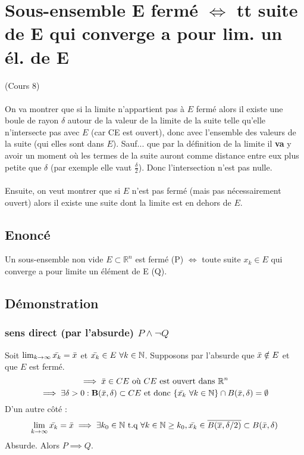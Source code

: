 \documentclass{article}
\begin{document}
\newpage

\section{Sous-ensemble E fermé $ \Leftrightarrow $ tt suite de E qui converge a pour lim. un él. de E}

(Cours 8)\\\\
On va montrer que si la limite n'appartient pas à $E$ fermé alors il existe une boule de rayon $\delta$ autour de la valeur de la limite de la suite telle qu'elle n'intersecte pas avec $E$ (car CE est ouvert), donc avec l'ensemble des valeurs de la suite (qui elles sont dans $E$). Sauf... que par la définition de la limite il \textbf{va} y avoir un moment où les termes de la suite auront comme distance entre eux plus petite que $\delta$ (par exemple elle vaut $\frac{\delta}{2}$). Donc l'intersection n'est pas nulle.\\\\
Ensuite, on veut montrer que si $E$ n'est pas fermé (mais pas nécessairement ouvert) alors il existe une suite dont la limite est en dehors de $E$.

\subsection{Enoncé}

Un sous-ensemble non vide $ E \subset \mathbb{R}^n $ est fermé (P) $\Leftrightarrow$ toute suite $ x_k \in E $ qui converge a pour limite un élément de E (Q).

\subsection{Démonstration}

\subsubsection{sens direct (par l'absurde) $ P \wedge \neg{Q} $}

Soit $ \lim_{k\to\infty} \Bar{x_k} = \Bar{x} $ et $ \Bar{x_k} \in E\ \forall k \in \mathbb{N}  $. Supposons par l'absurde que $ \Bar{x} \notin E $ et que $ E $ est fermé.
\[ \implies \Bar{x} \in CE \text{ où $ CE $ est ouvert dans } \mathbb{R}^n \]
\[ \implies \exists \delta > 0 : \mathbf{B}(\Bar{x}, \delta) \subset CE \text{ et donc } \{ \Bar{x_k}\ \forall k \in \mathbb{N} \} \cap B(\Bar{x}, \delta) = \emptyset \]
D'un autre côté :
\[ \lim_{k\to\infty} \Bar{x_k} = \Bar{x} \implies \exists k_0 \in \mathbb{N} \text{ t.q } \forall k \in \mathbb{N} \geq k_0, \Bar{x_k} \in \overline{B(\overline{x}, \delta/2)} \subset B({\Bar{x}, \delta}) \]
Absurde. Alors $ P \implies Q $.
\end{document}
